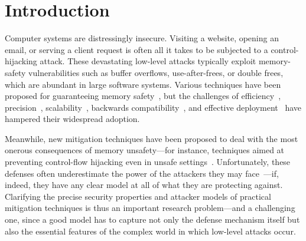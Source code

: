 \documentclass[10pt, conference, compsocconf, letterpaper, times]{IEEEtran}
\begin{document}
\ifsooner
{}
\fi

\section{Introduction}
\label{sec:intro}

Computer systems are distressingly insecure.
Visiting a website, opening an email, or serving a client request is often
all it takes to be subjected to a control-hijacking attack.
These devastating low-level attacks typically exploit memory-safety
vulnerabilities such as buffer overflows, use-after-frees, or double
frees, which are abundant in large software systems.
Various techniques have been
proposed for guaranteeing memory safety~\cite{NagarakatteZMZ09, NagarakatteZMZ10, DeviettiBMZ08,
  Nagarakatte2013, NagarakatteMZ14, NagarakatteMZ15,
  interlocks_ahns2012, micropolicies2015, LowFat2013}, but
the challenges of efficiency~\cite{NagarakatteZMZ09, NagarakatteZMZ10},
precision~\cite{m7}, scalability~\cite{ZitserLL04}, backwards
compatibility~\cite{cheri_asplos2015}, and effective
deployment~\cite{DeviettiBMZ08, Nagarakatte2013, NagarakatteMZ14,
  NagarakatteMZ15, interlocks_ahns2012, micropolicies2015, LowFat2013,
  pump_asplos2015}
have hampered their widespread adoption.

Meanwhile, new mitigation techniques have been proposed to deal with the most
onerous consequences of memory  unsafety---for instance, techniques
aimed at preventing
control-flow hijacking even in unsafe
settings~\cite{Abadi2005, AbadiBEL09, Erlingsson07, TiceRCCELP14, BurowCBPNLF16}.
Unfortunately, these defenses often underestimate the power of the attackers
they may face~\cite{Erlingsson07, SnowMDDLS13, outofcontrol_ieeesp2014,
  DaviSLM14, EvansLOSROS15, EvansFGOTSSRO15}---if, indeed, they have any
clear model at all of what they are protecting against.
Clarifying the precise security properties and
attacker models of practical mitigation techniques is thus an important
research problem---and a challenging one, since a good model has to capture
not only the defense mechanism itself but also the essential features of the
complex world in which low-level attacks occur.
\end{document}
